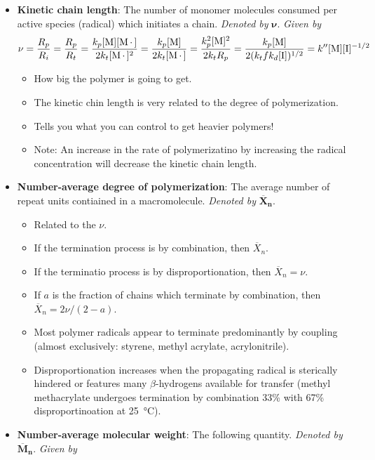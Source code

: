 \documentclass[../notes.tex]{subfiles}
\begin{document}
\begin{itemize}
    \item \textbf{Kinetic chain length}: The number of monomer molecules consumed per active species (radical) which initiates a chain. \emph{Denoted by} $\bm{\nu}$. \emph{Given by}
    \begin{equation*}
        \nu = \frac{R_p}{R_i}
        = \frac{R_p}{R_t}
        = \frac{k_p[\ce{M}][\ce{M*}]}{2k_t[\ce{M*}]^2}
        = \frac{k_p[\ce{M}]}{2k_t[\ce{M*}]}
        = \frac{k_p^2[\ce{M}]^2}{2k_tR_p}
        = \frac{k_p[\ce{M}]}{2(k_tfk_d[\ce{I}])^{1/2}}
        = k''[\ce{M}][\ce{I}]^{-1/2}
    \end{equation*}
    \begin{itemize}
        \item How big the polymer is going to get.
        \item The kinetic chin length is very related to the degree of polymerization.
        \item Tells you what you can control to get heavier polymers!
        \item Note: An increase in the rate of polymerizatino by increasing the radical concentration will decrease the kinetic chain length.
    \end{itemize}
    \item \textbf{Number-average degree of polymerization}: The average number of repeat units contiained in a macromolecule. \emph{Denoted by} $\bm{\overline{X}_n}$.
    \begin{itemize}
        \item Related to the $\nu$.
        \item If the termination process is by combination, then $\overline{X}_n$.
        \item If the terminatio process is by disproportionation, then $\overline{X}_n=\nu$.
        \item If $a$ is the fraction of chains which terminate by combination, then $\overline{X}_n=2\nu/(2-a)$.
        \item Most polymer radicals appear to terminate predominantly by coupling (almost exclusively: styrene, methyl acrylate, acrylonitrile).
        \item Disproportionation increases when the propagating radical is sterically hindered or features many $\beta$-hydrogens available for transfer (methyl methacrylate undergoes termination by combination 33\% with 67\% disproportinoation at \SI{25}{\celsius}).
    \end{itemize}
    \item \textbf{Number-average molecular weight}: The following quantity. \emph{Denoted by} $\bm{\overline{M}_n}$. \emph{Given by}

\end{itemize}
\end{document}
